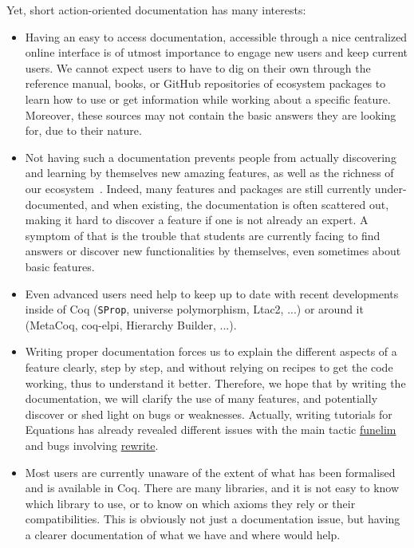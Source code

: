 \documentclass{easychair}
\begin{document}
Yet, short action-oriented documentation has many interests:
\begin{itemize}[itemsep=0pt]
  \item Having an easy to access documentation, accessible through a nice
        centralized online interface is of utmost importance to engage new
        users and keep current users.
        We cannot expect users to have to dig on their own through the
        reference manual, books, or GitHub repositories of ecosystem packages to learn how to use or
        get information while working about a specific feature.
        Moreover, these sources may not contain the basic answers
        they are looking for, due to their nature.
  \item Not having such a documentation prevents people from actually
        discovering and learning by themselves new amazing features, as well as
        the richness of our ecosystem~\cite{appel2022coq}.
        Indeed, many features and packages are still currently under-documented, and
        when existing, the documentation is often scattered out, making it hard
        to discover a feature if one is not already an expert.
        A symptom of that is the trouble that students are currently facing to
        find answers or discover new functionalities by themselves, even sometimes
        about basic features.
  \item Even advanced users need help to keep up to date with recent
        developments inside of Coq (\texttt{SProp}, universe polymorphism,
        Ltac2, ...) or around it (MetaCoq, coq-elpi, Hierarchy Builder, ...).
  \item Writing proper documentation forces us to explain the different aspects
        of a feature clearly, step by step, and without relying on recipes to
        get the code working, thus to understand it better.
        Therefore, we hope that by writing the documentation, we will clarify
        the use of many features, and potentially discover or shed light on bugs
        or weaknesses.
        Actually, writing tutorials for Equations has already revealed different
        issues with the main tactic \href{https://github.com/Zimmi48/platform-docs/pull/1}{funelim}
        and bugs involving \href{https://coq.zulipchat.com/#narrow/stream/237659-Equations-devs-.26-users/topic/Bug.20funelim.20on.20Ack}{rewrite}.
  \item Most users are currently unaware of the extent of what has been
        formalised and is available in Coq.
        There are many libraries, and it is not easy to know which library to
        use, or to know on which axioms they rely or their compatibilities.
        This is obviously not just a documentation issue, but having a clearer
        documentation of what we have and where would help.
\end{itemize}
\end{document}
